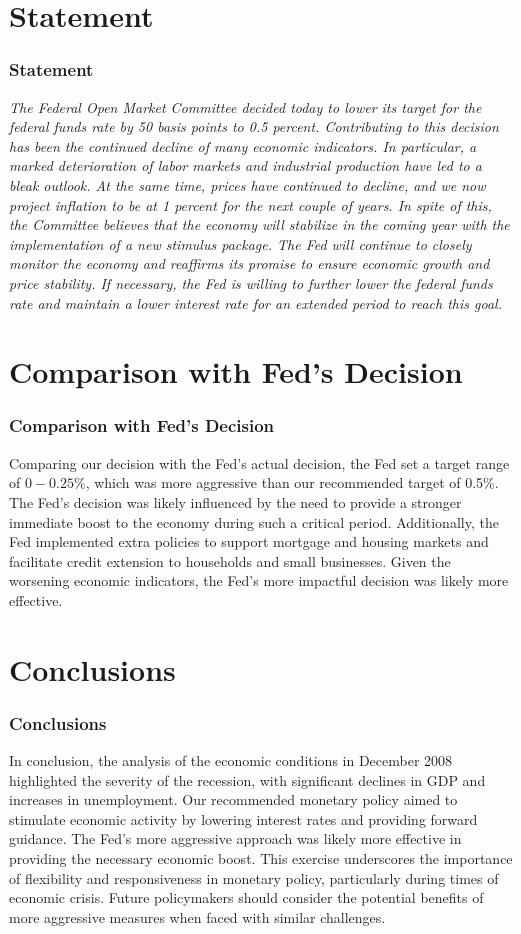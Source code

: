 \documentclass{beamer}
\begin{document}
\section{Statement}
\begin{frame}
    \frametitle{Statement}
    \textit{The Federal Open Market Committee decided today to lower its target for the federal funds rate by 50 basis points to 0.5 percent. Contributing to this decision has been the continued decline of many economic indicators. In particular, a marked deterioration of labor markets and industrial production have led to a bleak outlook. At the same time, prices have continued to decline, and we now project inflation to be at 1 percent for the next couple of years. In spite of this, the Committee believes that the economy will stabilize in the coming year with the implementation of a new stimulus package. The Fed will continue to closely monitor the economy and reaffirms its promise to ensure economic growth and price stability. If necessary, the Fed is willing to further lower the federal funds rate and maintain a lower interest rate for an extended period to reach this goal.}
\end{frame}

\section{Comparison with Fed's Decision}
\begin{frame}
    \frametitle{Comparison with Fed's Decision}
    Comparing our decision with the Fed's actual decision, the Fed set a target range of \(0-0.25\%\), which was more aggressive than our recommended target of 0.5\%. The Fed's decision was likely influenced by the need to provide a stronger immediate boost to the economy during such a critical period. Additionally, the Fed implemented extra policies to support mortgage and housing markets and facilitate credit extension to households and small businesses. Given the worsening economic indicators, the Fed's more impactful decision was likely more effective.
\end{frame}

\section{Conclusions}
\begin{frame}
    \frametitle{Conclusions}
    In conclusion, the analysis of the economic conditions in December 2008 highlighted the severity of the recession, with significant declines in GDP and increases in unemployment. Our recommended monetary policy aimed to stimulate economic activity by lowering interest rates and providing forward guidance. The Fed's more aggressive approach was likely more effective in providing the necessary economic boost. This exercise underscores the importance of flexibility and responsiveness in monetary policy, particularly during times of economic crisis. Future policymakers should consider the potential benefits of more aggressive measures when faced with similar challenges.
\end{frame}
\end{document}
